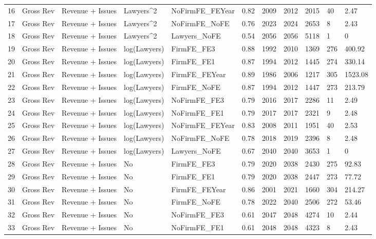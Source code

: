 \begin{table}[ht]
\begin{tabular}{rllllllllll}
  16 & Gross Rev & Revenue + Issues & Lawyers^2 & NoFirmFE\_FEYear & 0.82 & 2009 & 2012 & 2015 & 40 & 2.47 \\ 
  17 & Gross Rev & Revenue + Issues & Lawyers^2 & NoFirmFE\_NoFE & 0.76 & 2023 & 2024 & 2653 & 8 & 2.43 \\ 
  18 & Gross Rev & Revenue + Issues & Lawyers^2 & Lawyers\_NoFE & 0.54 & 2056 & 2056 & 5118 & 1 & 0 \\ 
  19 & Gross Rev & Revenue + Issues & log(Lawyers) & FirmFE\_FE3 & 0.88 & 1992 & 2010 & 1369 & 276 & 400.92 \\ 
  20 & Gross Rev & Revenue + Issues & log(Lawyers) & FirmFE\_FE1 & 0.87 & 1994 & 2012 & 1445 & 274 & 330.14 \\ 
  21 & Gross Rev & Revenue + Issues & log(Lawyers) & FirmFE\_FEYear & 0.89 & 1986 & 2006 & 1217 & 305 & 1523.08 \\ 
  22 & Gross Rev & Revenue + Issues & log(Lawyers) & FirmFE\_NoFE & 0.87 & 1994 & 2012 & 1447 & 273 & 213.79 \\ 
  23 & Gross Rev & Revenue + Issues & log(Lawyers) & NoFirmFE\_FE3 & 0.79 & 2016 & 2017 & 2286 & 11 & 2.49 \\ 
  24 & Gross Rev & Revenue + Issues & log(Lawyers) & NoFirmFE\_FE1 & 0.79 & 2017 & 2017 & 2321 & 9 & 2.48 \\ 
  25 & Gross Rev & Revenue + Issues & log(Lawyers) & NoFirmFE\_FEYear & 0.83 & 2008 & 2011 & 1951 & 40 & 2.53 \\ 
  26 & Gross Rev & Revenue + Issues & log(Lawyers) & NoFirmFE\_NoFE & 0.78 & 2018 & 2019 & 2396 & 8 & 2.48 \\ 
  27 & Gross Rev & Revenue + Issues & log(Lawyers) & Lawyers\_NoFE & 0.67 & 2040 & 2040 & 3653 & 1 & 0 \\ 
  28 & Gross Rev & Revenue + Issues & No & FirmFE\_FE3 & 0.79 & 2020 & 2038 & 2430 & 275 & 92.83 \\ 
  29 & Gross Rev & Revenue + Issues & No & FirmFE\_FE1 & 0.79 & 2020 & 2038 & 2447 & 273 & 77.72 \\ 
  30 & Gross Rev & Revenue + Issues & No & FirmFE\_FEYear & 0.86 & 2001 & 2021 & 1660 & 304 & 214.27 \\ 
  31 & Gross Rev & Revenue + Issues & No & FirmFE\_NoFE & 0.78 & 2022 & 2040 & 2506 & 272 & 53.46 \\ 
  32 & Gross Rev & Revenue + Issues & No & NoFirmFE\_FE3 & 0.61 & 2047 & 2048 & 4274 & 10 & 2.44 \\ 
  33 & Gross Rev & Revenue + Issues & No & NoFirmFE\_FE1 & 0.61 & 2048 & 2048 & 4323 & 8 & 2.43 \\ 

\end{tabular}
\end{table}
